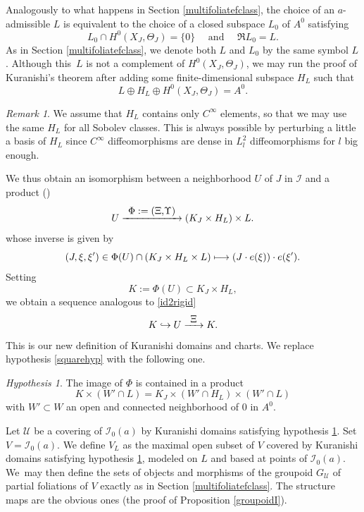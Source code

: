 \documentclass[JEP,XML,SOM,Unicode]{cedram}
\let\mathcal\mathscr
\def\mto{\mathchoice{\longmapsto}{\mapsto}{\mapsto}{\mapsto}}
\def\hto{\mathrel{\lhook\joinrel\to}}
\def\To#1{\mathchoice{\xrightarrow{\textstyle\kern4pt#1\kern3pt}}{\stackrel{#1}{\longrightarrow}}{}{}}
\theoremstyle{plain}
\theoremstyle{definition}
\theoremstyle{remark}
\newtheorem{remark}[theorem]{Remark}
\newtheorem{hypothesis}[theorem]{Hypothesis}
\numberwithin{equation}{section}
\newcommand{\cI}{\mathcal{I}}
\begin{document}
Analogously to what happens in Section \ref{multifoliatefclass}, the choice of an $a$-admissible $L$ is equivalent to the choice of a closed subspace $L_0$ of $A^0$ satisfying
\begin{equation}
\label{L0bis}
L_0\cap H^0(X_J,\Theta_J)=\{0\}\quad\text{ and }\quad\Re L_0=L.
\end{equation}
As in Section \ref{multifoliatefclass}, we denote both $L$ and $L_0$ by the same symbol $L$. Although this~$L$ is not a complement of $H^0(X_J,\Theta_J)$, we may run the proof of Kuranishi's theorem after adding some finite-dimensional subspace $H_L$ such that
\begin{equation}
\label{L+H}
L\oplus H_L\oplus H^0(X_J,\Theta_J)=A^0.
\end{equation}
\begin{remark}
\label{Cinfini}
We assume that $H_{L}$ contains only $C^\infty$ elements, so that we may use the same $H_L$ for all Sobolev classes. This is always possible by perturbing a little a basis of $H_L$ since $C^\infty$ diffeomorphisms are dense in $L^2_l$ diffeomorphisms for $l$ big enough.
\end{remark}
We thus obtain an isomorphism between a neighborhood $U$ of $J$ in $\cI$ and a product (\cf \cite[Th.\,7.2]{circle})\vspace*{-3pt}
\begin{equation}
\label{fatiso}
U\To{\Phi:=(\Xi\text{,}\Upsilon)}(K_J\times H_L)\times L.
\end{equation}
whose inverse is given by
\begin{equation}
\label{fatisoinverse}
(J,\xi,\xi')\in \Phi(U)\cap (K_J\times H_L\times L)\mto (J\cdot e(\xi))\cdot e(\xi').
\end{equation}
Setting
\begin{equation}
\label{K}
K:=\Phi(U)\subset K_J\times H_L,
\end{equation}
we obtain a sequence analogous to \eqref{id2rigid}
\begin{equation}
\label{id2bis}
K\hto U\To{\Xi}K.
\end{equation}
This is our new definition of Kuranishi domains and charts. We replace hypothesis \eqref{squarehyp} with the following one.
\begin{hypothesis}
\label{squarehyp2}
The image of $\Phi$ is contained in a product
\[
K\times (W'\cap L)=K_J\times (W'\cap H_L)\times (W'\cap L)
\]
with $W'\subset W$ an open and connected neighborhood of $0$ in $A^0$.
\end{hypothesis}
Let $\mathcal U$ be a covering of $\cI_0(a)$ by Kuranishi domains satisfying hypothesis \ref{squarehyp2}.
Set $V=\cI_0(a)$.
We define $V_L$ as the maximal open subset of $V$ covered by Kuranishi domains satisfying hypothesis \ref{squarehyp2}, modeled on $L$ and based at points of $\cI_0(a)$. We~may then define the sets of objects and morphisms of the groupoid $G_{\mathcal U}$ of partial foliations of $V$ exactly as in Section \ref{multifoliatefclass}. The structure maps are the obvious ones (\cf the proof of Proposition \ref{groupoidI}).
\end{document}
